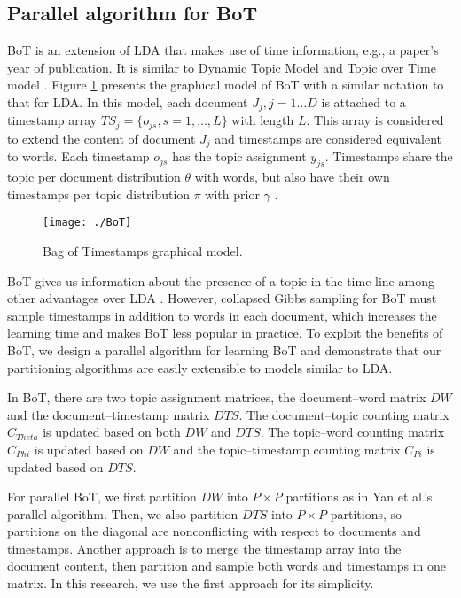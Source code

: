 \documentclass[10pt,conference]{IEEEtran}
\begin{document}
\subsection{Parallel algorithm for BoT}
BoT is an extension of LDA that makes use of time information, e.g., a paper's year of publication. It is similar to Dynamic Topic Model \cite{blei2006dynamic} and Topic over Time model \cite{wang2006topics}. Figure \ref{fig:BoT} presents the graphical model of BoT with a similar notation to that for LDA. In this model, each document $J_j, j = 1 \ldots D$ is attached to a timestamp array $TS_j = \{o_{js}, s = 1, \ldots, L\}$ with length $L$. This array is considered to extend the content of document $J_j$ and timestamps are considered equivalent to words. Each timestamp $ o_{js} $ has the topic assignment $ y_{js} $. Timestamps share the topic per document distribution $ \theta $ with words, but also have their own timestamps per topic distribution $ \pi $ with prior $ \gamma $ \cite{masada2009bag}.
\begin{figure}[h]
\centering
\texttt{[image: ./BoT]}
\caption{Bag of Timestamps graphical model.}
\label{fig:BoT}
\end{figure}

BoT gives us information about the presence of a topic in the time line among other advantages over LDA \cite{masada2009bag}. However, collapsed Gibbs sampling for BoT must sample timestamps in addition to words in each document, which increases the learning time and makes BoT less popular in practice. To exploit the benefits of BoT, we design a parallel algorithm for learning BoT and demonstrate that our partitioning algorithms are easily extensible to models similar to LDA.

In BoT, there are two topic assignment matrices, the document--word matrix $DW$ and the document--timestamp matrix $DTS$. The document--topic counting matrix $C_{Theta}$ is updated based on both $DW$ and $DTS$. The topic--word counting matrix $C_{Phi}$ is updated based on $DW$ and the topic--timestamp counting matrix $C_{Pi}$ is updated based on $DTS$.

For parallel BoT, we first partition $DW$ into $P \times P$ partitions as in Yan et al.'s parallel algorithm. Then, we also partition $DTS$ into $P \times P$ partitions, so partitions on the diagonal are nonconflicting with respect to documents and timestamps. Another approach is to merge the timestamp array into the document content, then partition and sample both words and timestamps in one matrix. In this research, we use the first approach for its simplicity.
\end{document}
